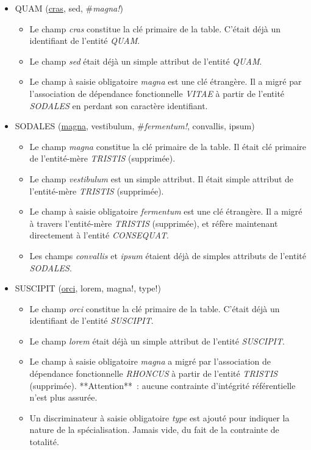 \documentclass[a4paper]{article}
\newcommand{\relat}[1]{\textsc{#1}}
\newcommand{\attr}[1]{#1}
\newcommand{\prim}[1]{\uline{#1}}
\newcommand{\foreign}[1]{\#\textsl{#1}}
\begin{document}
\begin{itemize}
  \item \relat{QUAM} (\prim{cras}, \attr{sed}, \foreign{magna!})
  \begin{itemize}
    \item Le champ \emph{cras} constitue la clé primaire de la table. C'était déjà un identifiant de l'entité \emph{QUAM}.
    \item Le champ \emph{sed} était déjà un simple attribut de l'entité \emph{QUAM}.
    \item Le champ à saisie obligatoire \emph{magna} est une clé étrangère. Il a migré par l'association de dépendance fonctionnelle \emph{VITAE} à partir de l'entité \emph{SODALES} en perdant son caractère identifiant.
  \end{itemize}

  \item \relat{SODALES} (\prim{magna}, \attr{vestibulum}, \foreign{fermentum!}, \attr{convallis}, \attr{ipsum})
  \begin{itemize}
    \item Le champ \emph{magna} constitue la clé primaire de la table. Il était clé primaire de l'entité-mère \emph{TRISTIS} (supprimée).
    \item Le champ \emph{vestibulum} est un simple attribut. Il était simple attribut de l'entité-mère \emph{TRISTIS} (supprimée).
    \item Le champ à saisie obligatoire \emph{fermentum} est une clé étrangère. Il a migré à travers l'entité-mère \emph{TRISTIS} (supprimée), et réfère maintenant directement à l'entité \emph{CONSEQUAT}.
    \item Les champs \emph{convallis} et \emph{ipsum} étaient déjà de simples attributs de l'entité \emph{SODALES}.
  \end{itemize}

  \item \relat{SUSCIPIT} (\prim{orci}, \attr{lorem}, \attr{magna!}, \attr{type!})
  \begin{itemize}
    \item Le champ \emph{orci} constitue la clé primaire de la table. C'était déjà un identifiant de l'entité \emph{SUSCIPIT}.
    \item Le champ \emph{lorem} était déjà un simple attribut de l'entité \emph{SUSCIPIT}.
    \item Le champ à saisie obligatoire \emph{magna} a migré par l'association de dépendance fonctionnelle \emph{RHONCUS} à partir de l'entité \emph{TRISTIS} (supprimée). **Attention** : aucune contrainte d'intégrité référentielle n'est plus assurée.
    \item Un discriminateur à saisie obligatoire \emph{type} est ajouté pour indiquer la nature de la spécialisation. Jamais vide, du fait de la contrainte de totalité.
  \end{itemize}


\end{itemize}
\end{document}
